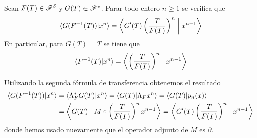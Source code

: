 \begin{teorema}
    Sean $F(T) \in \mathscr{F}^\delta$ y $G(T) \in \mathscr{F}^*$. Parar todo entero $n \geq 1$ se verifica que
    \begin{equation*}
        \langle G(F^{-1}(T)) | x^n \rangle = \left\langle G'(T)\left(\frac{T}{F(T)}\right)^{n} \biggm| x^{n-1} \right\rangle
    \end{equation*} 
    En particular, para $G(T) = T$ se tiene que
    \begin{equation*}
        \langle F^{-1}(T) | x^n \rangle = \left\langle \left(\frac{T}{F(T)}\right)^{n} \biggm| x^{n-1} \right\rangle
    \end{equation*}
\end{teorema}

\begin{demo}
    Utilizando la segunda fórmula de transferencia obtenemos el resultado
    \begin{align*}
        \langle G(F^{-1}(T)) | x^n \rangle & = \langle \Lambda_F^*G(T) | x^n \rangle = \langle G(T) | \Lambda_F x^n \rangle = \langle G(T) | p_n(x) \rangle \\
        & = \left\langle G(T) \biggm| M \circ \left(\frac{T}{F(T)}\right)^{n} x^{n-1} \right\rangle = \left\langle G'(T) \left(\frac{T}{F(T)}\right)^{n} \biggm| x^{n-1} \right\rangle
    \end{align*}
    donde hemos usado nuevamente que el operador adjunto de $M$ es $\partial$.
\end{demo}


